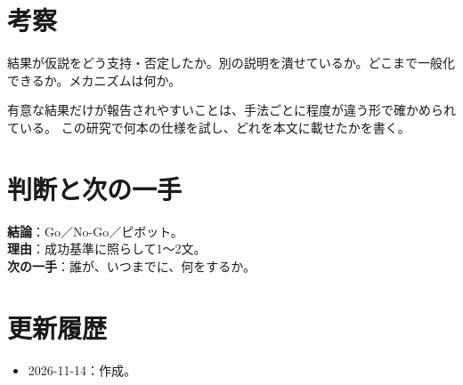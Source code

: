 \documentclass[a4paper,10pt]{ltjsarticle}
\begin{document}
\section{考察}\label{sec:discussion}
結果が仮説をどう支持・否定したか。別の説明を潰せているか。どこまで一般化できるか。メカニズムは何か。

\begin{pitfall}
有意な結果だけが報告されやすいことは、手法ごとに程度が違う形で確かめられている\parencite{brodeur2020}。
この研究で何本の仕様を試し、どれを本文に載せたかを書く。
\end{pitfall}

\section{判断と次の一手}\label{sec:decision}
\begin{decision}
\textbf{結論}：Go／No-Go／ピボット。\\
\textbf{理由}：成功基準に照らして1〜2文。\\
\textbf{次の一手}：誰が、いつまでに、何をするか。
\end{decision}

\section*{更新履歴}
\begin{itemize}
  \item 2026-11-14：作成。
\end{itemize}

\printbibliography[title={参考文献}]
\end{document}

